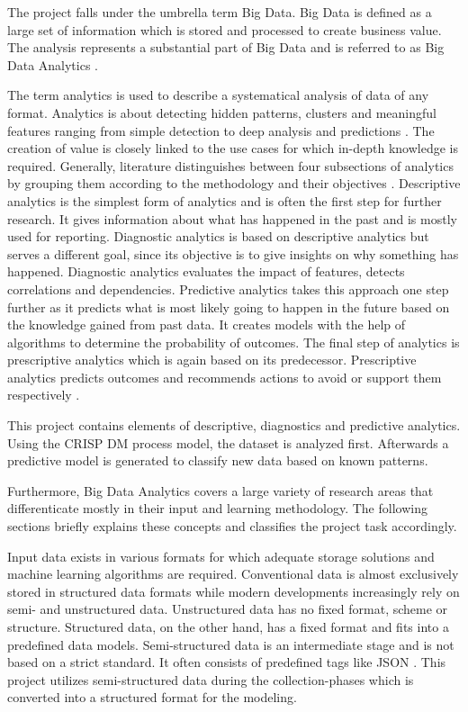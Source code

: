 The project falls under the umbrella term Big Data. Big Data is defined as a large set of information
which is stored and processed to create business value. The analysis represents a substantial part of Big Data and is 
referred to as Big Data Analytics \cite[p. 4]{Meier_2021}. 

The term analytics is used to describe a systematical analysis of data of any format. Analytics is 
about detecting hidden patterns, clusters and meaningful features ranging from simple detection 
to deep analysis and predictions \cite[p. 2]{Tanwar2015}.
The creation of value is closely linked to 
the use cases for which in-depth knowledge is required. Generally, literature distinguishes 
between four subsections of analytics by grouping them according to the methodology 
and their objectives \cite[p. 8f]{Meier_2021}. Descriptive analytics is the simplest 
form of analytics and is often the first step for further research. It gives 
information about what has happened in the past and is mostly used for reporting. Diagnostic analytics is based on descriptive 
analytics but serves a different goal, since its objective is to give insights on why something has 
happened. Diagnostic analytics evaluates the impact of features, detects correlations 
and dependencies. Predictive analytics takes this approach one step further as it predicts what 
is most likely going to happen in the future based on the knowledge gained from past data. It 
creates models with the help of algorithms to determine the probability of outcomes. The final 
step of analytics is prescriptive analytics which is again based on its predecessor. Prescriptive 
analytics predicts outcomes and recommends actions to avoid or support them respectively \cite[p. 8f]{Meier_2021}.

This project contains elements of descriptive, diagnostics and predictive analytics. Using the 
\ac{CRISP DM} process model, the dataset is analyzed first. Afterwards a predictive model 
is generated to classify new data based on known patterns.


Furthermore, Big Data Analytics covers a large variety of research areas that differenticate mostly in 
their input and learning methodology. The following sections briefly explains these concepts and 
classifies the project task accordingly. 

Input data exists in various formats for which adequate storage solutions and machine learning 
algorithms are required. Conventional data is almost exclusively stored in structured data formats 
while modern developments increasingly rely on semi- and unstructured data. Unstructured data has no
fixed format, scheme or structure. Structured data, on the other hand, has a fixed format and fits into 
a predefined data models. Semi-structured data is an intermediate stage and is not based on a strict
standard. It often consists of predefined tags like \ac{JSON} \cite[p. 2f]{Tanwar2015}. This project utilizes semi-structured 
data during the collection-phases which is converted into a structured format for the modeling.

